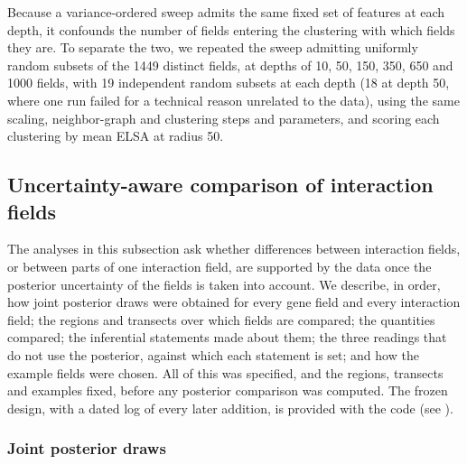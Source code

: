 \documentclass[10pt,letterpaper]{article}
\begin{document}
Because a variance-ordered sweep admits the same fixed set of features at each depth, it confounds the number of fields entering the clustering with which fields they are. To separate the two, we repeated the sweep admitting uniformly random subsets of the 1449 distinct fields, at depths of 10, 50, 150, 350, 650 and 1000 fields, with 19 independent random subsets at each depth (18 at depth 50, where one run failed for a technical reason unrelated to the data), using the same scaling, neighbor-graph and clustering steps and parameters, and scoring each clustering by mean ELSA at radius 50.

\subsection*{Uncertainty-aware comparison of interaction fields}
\label{sec:meth-uq}

The analyses in this subsection ask whether differences between interaction fields, or between parts of one interaction field, are supported by the data once the posterior uncertainty of the fields is taken into account. We describe, in order, how joint posterior draws were obtained for every gene field and every interaction field; the regions and transects over which fields are compared; the quantities compared; the inferential statements made about them; the three readings that do not use the posterior, against which each statement is set; and how the example fields were chosen. All of this was specified, and the regions, transects and examples fixed, before any posterior comparison was computed. The frozen design, with a dated log of every later addition, is provided with the code (see ).

\subsubsection*{Joint posterior draws}
\label{sec:meth-draws}
\end{document}
